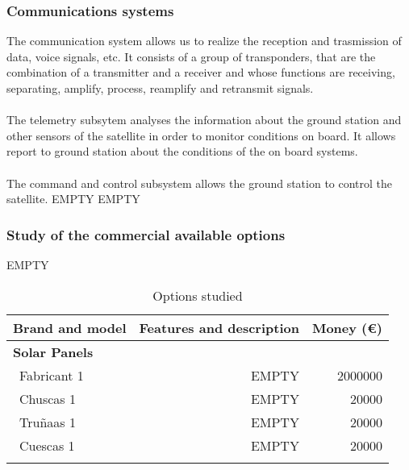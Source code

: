 \subsubsection{Communications systems}
The communication system allows us to realize the reception and trasmission of data, voice signals, etc. It consists of a group of transponders, that are the combination of a transmitter and a receiver and whose functions are receiving, separating, amplify, process, reamplify and retransmit signals.
	\paragraph{} 
	The telemetry subsytem analyses the information about the ground station and other sensors of the satellite in 	order to monitor conditions on board. It allows report to ground station about the conditions of the on board 			systems.
	\paragraph{} 
	The command and control subsystem allows the ground station to control the satellite.
EMPTY
EMPTY

\subsubsection{Study of the commercial available options}
EMPTY
\begin{longtable}{| l | r | r | }
	\hline
	\rowcolor[gray]{0.80}	\textbf{Brand and model} &  \textbf{Features and description}     & \textbf{Money (\euro)}   \\
	\hline
	\endfirsthead
	
	\rowcolor[gray]{0.85} \textbf{Solar Panels} &  &  \\
	~Fabricant 1 & EMPTY & 2000000 \\
	~Chuscas 1 & EMPTY & 20000 \\
	~Truñaas 1 & EMPTY & 20000 \\
	~Cuescas 1 & EMPTY & 20000 \\
	\hline
	
	\caption{Options studied}
	\label{epsoptionstable}
\end{longtable}

